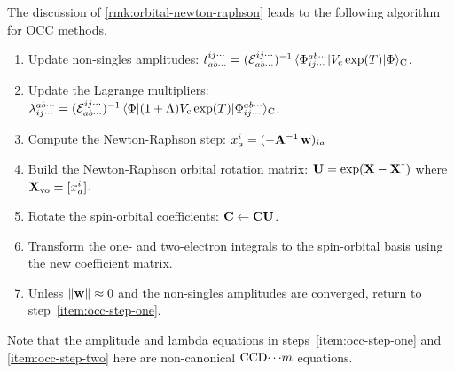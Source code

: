 \documentclass[11pt]{article}
\numberwithin{equation}{section}
\begin{document}
\begin{rmk}
The discussion of \cref{rmk:orbital-newton-raphson} leads to the following algorithm for OCC methods.
\begin{enumerate}
\item
\label{item:occ-step-one}
Update non-singles amplitudes:
$
  t_{ab\cdots}^{ij\cdots}
=
  (\mathcal{E}_{ab\cdots}^{ij\cdots})^{-1}\,
  \langle\Phi _{ij\cdots}^{ab\cdots}|
    V_{\mathrm{c}}\,
    \mathrm{exp}(T)
  |\Phi \rangle_{\mathrm{C}}
$.

\item
\label{item:occ-step-two}
Update the Lagrange multipliers:
$
  \lambda _{ij\cdots}^{ab\cdots}
=
  (\mathcal{E}_{ab\cdots}^{ij\cdots})^{-1}\,
  \langle\Phi |
    (1 + \Lambda )
    V_{\mathrm{c}}\,
    \mathrm{exp}(T)
  |\Phi _{ij\cdots}^{ab\cdots}\rangle_{\mathrm{C}}
$.

\item
Compute the Newton-Raphson step:
$
  x_a^i
=
  (-\mathbf{A}^{-1}\,\mathbf{w})_{ia}
$

\item
Build the Newton-Raphson orbital rotation matrix:
$
  \mathbf{U}
=
  \mathrm{exp}(\mathbf{X} - \mathbf{X}^\dagger)
$
where
$
  \mathbf{X}_{\mathrm{vo}}
=
  [x_a^i]
$.

\item
Rotate the spin-orbital coefficients:
$
  \mathbf{C}
\leftarrow
  \mathbf{C}\mathbf{U}
$.

\item
Transform the one- and two-electron integrals to the spin-orbital basis using the new coefficient matrix.

\item
Unless $\|\mathbf{w}\|\approx0$ and the non-singles amplitudes are converged, return to step~\ref{item:occ-step-one}.
\end{enumerate}
Note that the amplitude and lambda equations in steps~\ref{item:occ-step-one} and \ref{item:occ-step-two} here are non-canonical $\mathrm{CCD}{\cdots}m$ equations.
\end{rmk}
\end{document}
